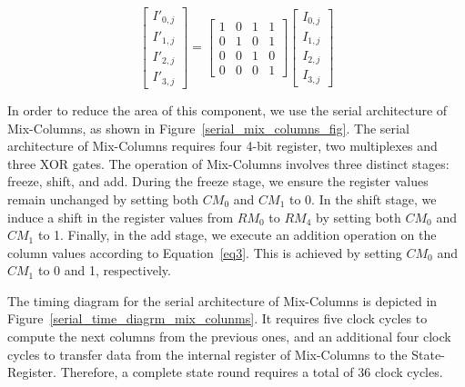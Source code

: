 \documentclass[sn-basic]{sn-jnl}%
\begin{document}
\begin{equation}
    \begin{bmatrix}
        I'_{0,j} \\
        I'_{1,j} \\
        I'_{2,j} \\
        I'_{3,j}
    \end{bmatrix}
    =
    \begin{bmatrix}
        1 & 0 & 1 & 1 \\
        0 & 1 & 0 & 1 \\
        0 & 0 & 1 & 0 \\
        0 & 0 & 0 & 1
    \end{bmatrix}
    \begin{bmatrix}
        I_{0,j} \\
        I_{1,j} \\
        I_{2,j} \\
        I_{3,j}
    \end{bmatrix}
    \label{eq3}
\end{equation}


In order to reduce the area of this component, we use the serial architecture of Mix-Columns, as shown in Figure~\ref{serial_mix_columns_fig}.
The serial architecture of Mix-Columns requires four 4-bit register, two multiplexes and three XOR gates.
The operation of Mix-Columns involves three distinct stages: freeze, shift, and add.
During the freeze stage, we ensure the register values remain unchanged by setting both $CM_0$ and $CM_1$ to 0.
In the shift stage, we induce a shift in the register values from $RM_0$ to $RM_4$ by setting both $CM_0$ and $CM_1$ to 1.
Finally, in the add stage, we execute an addition operation on the column values according to Equation~\ref{eq3}. This is achieved by setting $CM_0$ and $CM_1$ to 0 and 1, respectively.

The timing diagram for the serial architecture of Mix-Columns is depicted in Figure~\ref{serial_time_diagrm_mix_colunms}.
It requires five clock cycles to compute the next columns from the previous ones, and an additional four clock cycles to transfer data from the internal register of Mix-Columns to the State-Register.
Therefore, a complete state round requires a total of 36 clock cycles.
\end{document}
